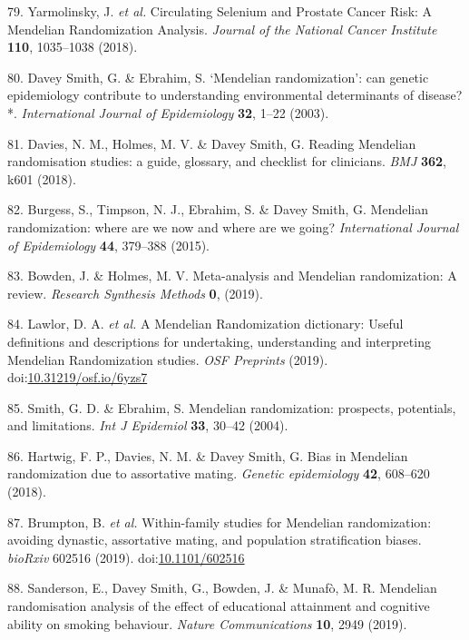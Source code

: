 \documentclass[11pt,twoside]{bristolthesis}
\begin{document}
\leavevmode\hypertarget{ref-Yarmolinsky2018}{}%
79. Yarmolinsky, J. \emph{et al.} Circulating Selenium and Prostate Cancer Risk: A Mendelian Randomization Analysis. \emph{Journal of the National Cancer Institute} \textbf{110}, 1035--1038 (2018).

\leavevmode\hypertarget{ref-DaveySmith2003}{}%
80. Davey Smith, G. \& Ebrahim, S. `Mendelian randomization': can genetic epidemiology contribute to understanding environmental determinants of disease?*. \emph{International Journal of Epidemiology} \textbf{32}, 1--22 (2003).

\leavevmode\hypertarget{ref-Davies2018}{}%
81. Davies, N. M., Holmes, M. V. \& Davey Smith, G. Reading Mendelian randomisation studies: a guide, glossary, and checklist for clinicians. \emph{BMJ} \textbf{362}, k601 (2018).

\leavevmode\hypertarget{ref-Burgess2015}{}%
82. Burgess, S., Timpson, N. J., Ebrahim, S. \& Davey Smith, G. Mendelian randomization: where are we now and where are we going? \emph{International Journal of Epidemiology} \textbf{44}, 379--388 (2015).

\leavevmode\hypertarget{ref-Bowden2019}{}%
83. Bowden, J. \& Holmes, M. V. Meta-analysis and Mendelian randomization: A review. \emph{Research Synthesis Methods} \textbf{0}, (2019).

\leavevmode\hypertarget{ref-Lawlor2019}{}%
84. Lawlor, D. A. \emph{et al.} A Mendelian Randomization dictionary: Useful definitions and descriptions for undertaking, understanding and interpreting Mendelian Randomization studies. \emph{OSF Preprints} (2019). doi:\href{https://doi.org/10.31219/osf.io/6yzs7}{10.31219/osf.io/6yzs7}

\leavevmode\hypertarget{ref-Smith2004}{}%
85. Smith, G. D. \& Ebrahim, S. Mendelian randomization: prospects, potentials, and limitations. \emph{Int J Epidemiol} \textbf{33}, 30--42 (2004).

\leavevmode\hypertarget{ref-Hartwig2018}{}%
86. Hartwig, F. P., Davies, N. M. \& Davey Smith, G. Bias in Mendelian randomization due to assortative mating. \emph{Genetic epidemiology} \textbf{42}, 608--620 (2018).

\leavevmode\hypertarget{ref-Brumpton2019}{}%
87. Brumpton, B. \emph{et al.} Within-family studies for Mendelian randomization: avoiding dynastic, assortative mating, and population stratification biases. \emph{bioRxiv} 602516 (2019). doi:\href{https://doi.org/10.1101/602516}{10.1101/602516}

\leavevmode\hypertarget{ref-Sanderson2019}{}%
88. Sanderson, E., Davey Smith, G., Bowden, J. \& Munafò, M. R. Mendelian randomisation analysis of the effect of educational attainment and cognitive ability on smoking behaviour. \emph{Nature Communications} \textbf{10}, 2949 (2019).
\end{document}
